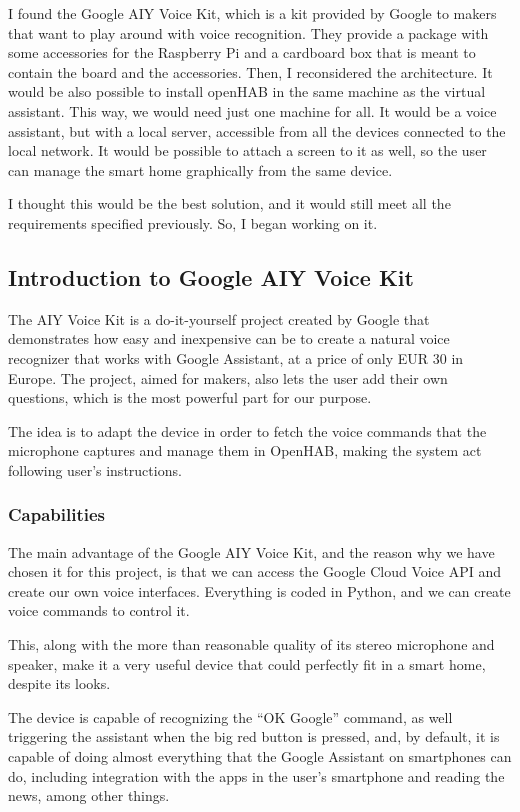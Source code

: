 I found the Google AIY Voice Kit, which is a kit provided by Google to makers that want to play around with voice recognition.
They provide a package with some accessories for the Raspberry Pi and a cardboard box that is meant to contain the board and the
accessories. Then, I reconsidered the architecture. It would be also possible to install openHAB in the same machine as the virtual
assistant. This way, we would need just one machine for all. It would be a voice assistant, but with a local server, accessible from
all the devices connected to the local network. It would be possible to attach a screen to it as well, so the user can manage the
smart home graphically from the same device.

I thought this would be the best solution, and it would still meet all the requirements specified previously. So, I began working on it.

\subsection{Introduction to Google AIY Voice Kit}
The AIY Voice Kit is a do-it-yourself project created by Google that demonstrates how easy and inexpensive can be to create a natural 
voice recognizer that works with Google Assistant, at a price of only EUR 30 in Europe. The project, aimed for makers, also lets the 
user add their own questions, which is the most powerful part for our purpose. 

The idea is to adapt the device in order to fetch the voice commands that the microphone captures and manage them in OpenHAB, 
making the system act following user’s instructions.

\subsubsection{Capabilities}
The main advantage of the Google AIY Voice Kit, and the reason why we have chosen it for this project, is that we can access the 
Google Cloud Voice API and create our own voice interfaces. Everything is coded in Python, and we can create voice commands to 
control it.

This, along with the more than reasonable quality of its stereo microphone and speaker, make it a very useful device that could 
perfectly fit in a smart home, despite its looks.

The device is capable of recognizing the “OK Google” command, as well triggering the assistant when the big red button is pressed, 
and, by default, it is capable of doing almost everything that the Google Assistant on smartphones can do, including integration 
with the apps in the user’s smartphone and reading the news, among other things.

